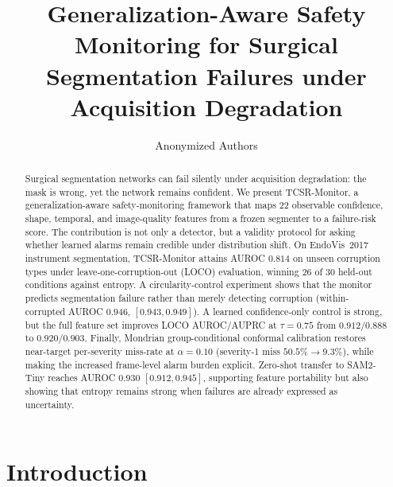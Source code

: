 \documentclass[runningheads]{llncs}
\newcommand{\monitor}{TCSR-Monitor}
\begin{document}
\title{Generalization-Aware Safety Monitoring for Surgical\\
Segmentation Failures under Acquisition Degradation}

\author{Anonymized Authors}

\maketitle

\begin{abstract}
Surgical segmentation networks can fail silently under acquisition degradation:
the mask is wrong, yet the network remains confident. We present
\monitor{}, a generalization-aware safety-monitoring framework that maps
$22$ observable confidence, shape, temporal, and image-quality features from a
frozen segmenter to a failure-risk score. The contribution is not only a
detector, but a validity protocol for asking whether learned alarms remain
credible under distribution shift. On EndoVis~2017 instrument segmentation,
\monitor{} attains AUROC $0.814$ on unseen corruption types under
leave-one-corruption-out (LOCO) evaluation, winning $26$ of $30$ held-out
conditions against entropy. A circularity-control experiment shows that the
monitor predicts segmentation failure rather than merely detecting corruption
(within-corrupted AUROC $0.946$, $[0.943,0.949]$). A learned confidence-only
control is strong, but the full feature set improves LOCO AUROC/AUPRC at
$\tau=0.75$ from $0.912/0.888$ to $0.920/0.903$. Finally, Mondrian
group-conditional conformal calibration restores near-target per-severity
miss-rate at $\alpha=0.10$ (severity-1 miss $50.5\%\rightarrow9.3\%$), while
making the increased frame-level alarm burden explicit. Zero-shot transfer to
SAM2-Tiny reaches AUROC $0.930$ $[0.912,0.945]$, supporting feature
portability but also showing that entropy remains strong when failures are
already expressed as uncertainty.

\end{abstract}

\section{Introduction}
\end{document}
